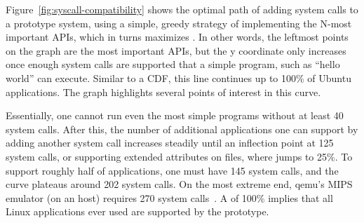 


Figure~\ref{fig:syscall-compatibility} shows the optimal path of adding system calls to a prototype system,
using a simple, greedy strategy of implementing the N-most important APIs, which in turns
maximizes \compatmetric{}.
In other words, the leftmost points on the graph are the most important APIs,
but the y coordinate only increases once enough system calls
are supported that a simple program, such as ``hello world'' can execute. %
Similar to a CDF, this line
continues up to 100\% of Ubuntu applications.  The graph highlights several 
points of interest in this curve.

Essentially, one cannot run even the most simple programs without at least 40 system calls.
After this, the number of additional applications one can support by adding another system call increases
steadily until an inflection point at 125 system calls, or supporting extended attributes on files,
where \compatmetric{} jumps to 25\%.
To support roughly half of \osdist{} applications, one must have 145 system calls, and
the curve plateaus around 202 system calls.  
On the most extreme end, qemu's MIPS emulator (on an \osarch{} host) requires 270 system calls~\citep{Bellard05}.
A \compatmetric{} of 100\% implies that
all Linux applications ever used
are supported by the prototype.

